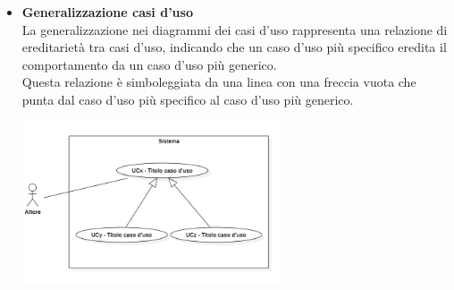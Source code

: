 \begin{itemize}
\begin{itemize}
        \item \textbf{Generalizzazione casi d'uso} \\
        La generalizzazione nei diagrammi dei casi d'uso rappresenta una relazione di ereditarietà tra casi d'uso, indicando che un caso d'uso più specifico eredita il comportamento da un caso d'uso più generico. \\
        Questa relazione è simboleggiata da una linea con una freccia vuota che punta dal caso d'uso più specifico al caso d'uso più generico.
        \begin{minipage}[t]{\linewidth}
            \centering
            \includegraphics[width=0.6\textwidth]{../Images/NormeDiProgetto/GeneralizzazioneUC.PNG}
        \end{minipage}
    \end{itemize}

\end{itemize}

